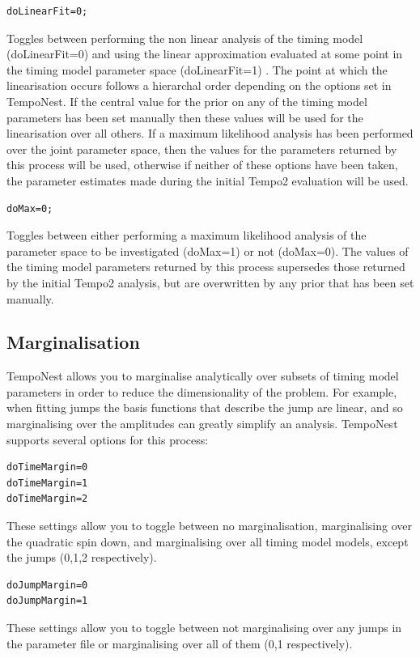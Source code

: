 \documentclass[%
 preprint,
 amsmath,amssymb,amsfonts,
 aps,
]{revtex4-1}
\begin{document}
\begin{lstlisting}
doLinearFit=0;
\end{lstlisting}
%
Toggles between performing the non linear analysis of the timing model (doLinearFit=0) and using the linear approximation evaluated at some point in the timing model parameter space  (doLinearFit=1) .  The point at which the linearisation occurs follows a hierarchal order depending on the options set in TempoNest.  If the central value for the prior on any of the timing model parameters has been set manually then these values will be used for the linearisation over all others.  If a maximum likelihood analysis has been performed over the joint parameter space, then the values for the parameters returned by this process will be used, otherwise if neither of these options have been taken, the parameter estimates made during the initial Tempo2 evaluation will be used.

\begin{lstlisting}
doMax=0;
\end{lstlisting}
%
Toggles between either performing a maximum likelihood analysis of the parameter space to be investigated (doMax=1) or not (doMax=0).  The values of the timing model parameters returned by this process supersedes those returned by the initial Tempo2 analysis, but are overwritten by any prior that has been set manually. 

\subsection{Marginalisation}

TempoNest allows you to marginalise analytically over subsets of timing model parameters in order to reduce the dimensionality of the problem.  For example, when fitting jumps the basis functions that describe the jump are linear, and so marginalising over the amplitudes can greatly simplify an analysis.  TempoNest supports several options for this process:

\begin{lstlisting}
doTimeMargin=0
doTimeMargin=1
doTimeMargin=2
\end{lstlisting}
%
These settings allow you to toggle between no marginalisation, marginalising over the quadratic spin down, and marginalising over all timing model models, except the jumps (0,1,2 respectively).

\begin{lstlisting}
doJumpMargin=0
doJumpMargin=1
\end{lstlisting}
%
These settings allow you to toggle between not marginalising over any jumps in the parameter file or marginalising over all of them (0,1 respectively).
\end{document}
